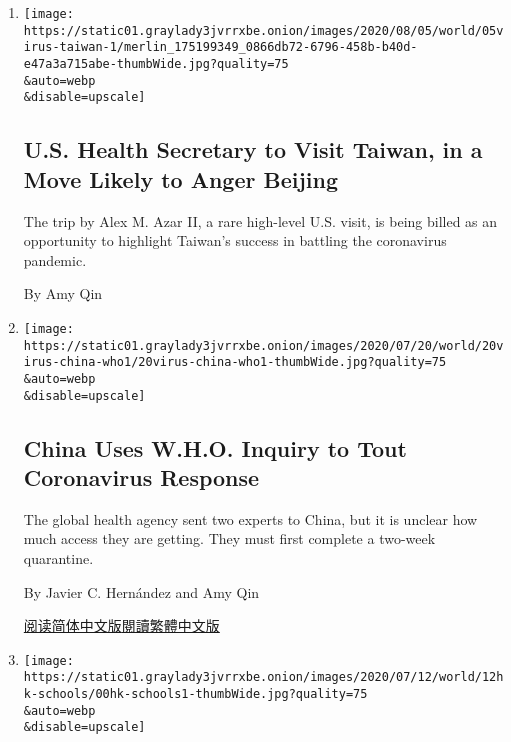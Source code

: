 \begin{enumerate}
\def\labelenumi{\arabic{enumi}.}
\item
  \href{/2020/08/04/world/asia/taiwan-azar-beijing-coronavirus.html}{}

  \texttt{[image: https://static01.graylady3jvrrxbe.onion/images/2020/08/05/world/05virus-taiwan-1/merlin\_175199349\_0866db72-6796-458b-b40d-e47a3a715abe-thumbWide.jpg?quality=75\\\&auto=webp\\\&disable=upscale]}

  \hypertarget{us-health-secretary-to-visit-taiwan-in-a-move-likely-to-anger-beijing}{%
  \subsection{U.S. Health Secretary to Visit Taiwan, in a Move Likely to
  Anger
  Beijing}\label{us-health-secretary-to-visit-taiwan-in-a-move-likely-to-anger-beijing}}

  The trip by Alex M. Azar II, a rare high-level U.S. visit, is being
  billed as an opportunity to highlight Taiwan's success in battling the
  coronavirus pandemic.

  By Amy Qin
\item
  \href{/2020/07/21/world/asia/china-coronavirus-who.html}{}

  \texttt{[image: https://static01.graylady3jvrrxbe.onion/images/2020/07/20/world/20virus-china-who1/20virus-china-who1-thumbWide.jpg?quality=75\\\&auto=webp\\\&disable=upscale]}

  \hypertarget{china-uses-who-inquiry-to-tout-coronavirus-response}{%
  \subsection{China Uses W.H.O. Inquiry to Tout Coronavirus
  Response}\label{china-uses-who-inquiry-to-tout-coronavirus-response}}

  The global health agency sent two experts to China, but it is unclear
  how much access they are getting. They must first complete a two-week
  quarantine.

  By Javier C. Hernández and Amy Qin

  \href{https://cn.nytimes3xbfgragh.onion/china/20200722/china-coronavirus-who/}{阅读简体中文版}\href{https://cn.nytimes3xbfgragh.onion/china/20200722/china-coronavirus-who/zh-hant/}{閱讀繁體中文版}
\item
  \href{/2020/07/11/world/asia/china-hong-kong-security-schools.html}{}

  \texttt{[image: https://static01.graylady3jvrrxbe.onion/images/2020/07/12/world/12hk-schools/00hk-schools1-thumbWide.jpg?quality=75\\\&auto=webp\\\&disable=upscale]}


\end{enumerate}
